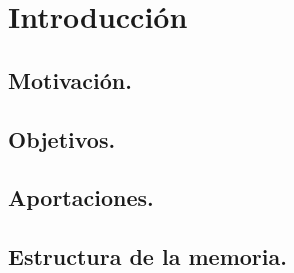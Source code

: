 \documentclass[11pt,a4paper,twoside]{report}
\author{nombre y apellidos}
\begin{document}
\chapter{Introducción}


\section{Motivación.}



\section{Objetivos.}



\section{Aportaciones.}



\section{Estructura de la memoria.}
\end{document}

